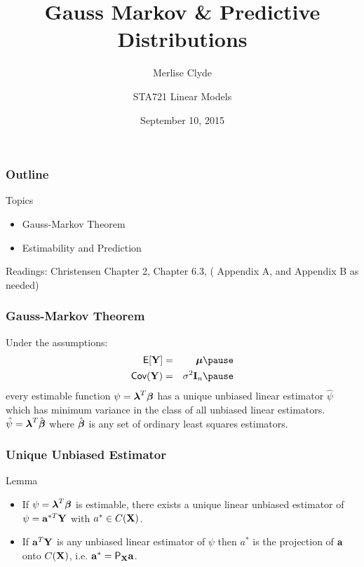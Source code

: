 \documentclass[handout]{beamer}
\title{Gauss Markov \& Predictive Distributions}
\subtitle{Merlise Clyde}
\author{STA721 Linear Models}
\institute{Duke University}
\date{September 10, 2015}
\begin{document}
\maketitle

\begin{frame}\frametitle{Outline}
Topics
  \begin{itemize}
  \item Gauss-Markov Theorem
  \item Estimability and Prediction
  \end{itemize}


Readings: Christensen Chapter 2,  Chapter 6.3, ( Appendix A, and
Appendix B as needed)
\end{frame}

\begin{frame}
  \frametitle{Gauss-Markov Theorem}
  \begin{theorem}

  Under the assumptions:
  \begin{eqnarray*}
    \E[\Y] & = & \mub \pause \\
    \Cov(\Y) & = &\sigma^2 \I_n \pause
  \end{eqnarray*}
every estimable function $\psi = \boldsymbol{\lambda}^T\boldsymbol{\beta}$ has a unique unbiased
linear estimator $\hat{\psi}$ which has minimum variance in the class
of all unbiased linear estimators. \pause  $\hat{\psi} = \boldsymbol{\lambda}^T\hat{\boldsymbol{\beta}}$
where $\hat{\boldsymbol{\beta}}$ is any set of ordinary least squares
estimators.
    
  \end{theorem}
\end{frame}
\begin{frame}
  \frametitle{Unique Unbiased Estimator}
  \begin{block}{Lemma}
    \begin{itemize}
    \item 
    If   $\psi = \boldsymbol{\lambda}^T \boldsymbol{\beta}$ is estimable, there exists a unique
    linear unbiased estimator of $\psi = \mathbf{a}^{*T}\mathbf{Y}$ with $a^* \in
    C(\mathbf{X})$. \pause 
\item If $\mathbf{a}^T\mathbf{Y}$ is any unbiased linear estimator of $\psi$
    then $a^*$ is the projection of $\mathbf{a}$ onto $C(\mathbf{X})$, i.e. $\mathbf{a}^* =
    \textsf{P}_{\mathbf{X}} \mathbf{a}$.
    \end{itemize}

  \end{block} 
      \end{frame}
\end{document}
